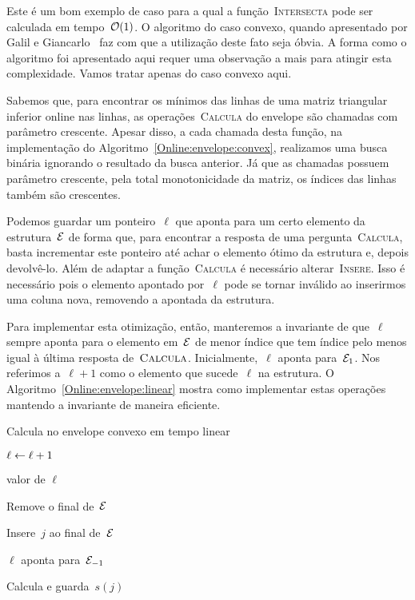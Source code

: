 Este é um bom exemplo de caso para a qual a função~\textsc{Intersecta} pode ser calculada em tempo~$\mathcal{O}(1)$. O algoritmo do caso convexo, quando apresentado por Galil e Giancarlo~\cite{Galil:1989} faz com que a utilização deste fato seja óbvia. A forma como o algoritmo foi apresentado aqui requer uma observação a mais para atingir esta complexidade. Vamos tratar apenas do caso convexo aqui.

Sabemos que, para encontrar os mínimos das linhas de uma matriz triangular inferior online nas linhas, as operações~\textsc{Calcula} do envelope são chamadas com parâmetro crescente. Apesar disso, a cada chamada desta função, na implementação do Algoritmo~\ref{Online:envelope:convex}, realizamos uma busca binária ignorando o resultado da busca anterior. Já que as chamadas possuem parâmetro crescente, pela total monotonicidade da matriz, os índices das linhas também são crescentes. 

Podemos guardar um ponteiro~$\ell$ que aponta para um certo elemento da estrutura~$\mathcal{E}$ de forma que, para encontrar a resposta de uma pergunta~\textsc{Calcula}, basta incrementar este ponteiro até achar o elemento ótimo da estrutura e, depois devolvê-lo. Além de adaptar a função~\textsc{Calcula} é necessário alterar~\textsc{Insere}. Isso é necessário pois o elemento apontado por~$\ell$ pode se tornar inválido ao inserirmos uma coluna nova, removendo a apontada da estrutura.

Para implementar esta otimização, então, manteremos a invariante de que~$\ell$ sempre aponta para o elemento em~$\mathcal{E}$ de menor índice que tem índice pelo menos igual à última resposta de~$\textsc{Calcula}$. Inicialmente,~$\ell$ aponta para~$\mathcal{E}_1$. Nos referimos a~$\ell + 1$ como o elemento que sucede~$\ell$ na estrutura. O Algoritmo~\ref{Online:envelope:linear} mostra como implementar estas operações mantendo a invariante de maneira eficiente.

\begin{algorithm}[h]
\caption{Calcula no envelope convexo em tempo linear}
\label{Online:envelope:linear}
\begin{algorithmic}[1]
        \State $\ell \leftarrow \ell+1$
    \EndWhile

    \State \Return valor de $\ell$
\EndFunction

        \State \Return
    \EndIf

        \State Remove o final de~$\mathcal{E}$
    \EndWhile

    \State Insere~$j$ ao final de~$\mathcal{E}$

        \State $\ell$ aponta para~$\mathcal{E}_{-1}$
    \EndIf

    \State Calcula e guarda~$s(j)$
\EndFunction
\end{algorithmic}
\end{algorithm}

